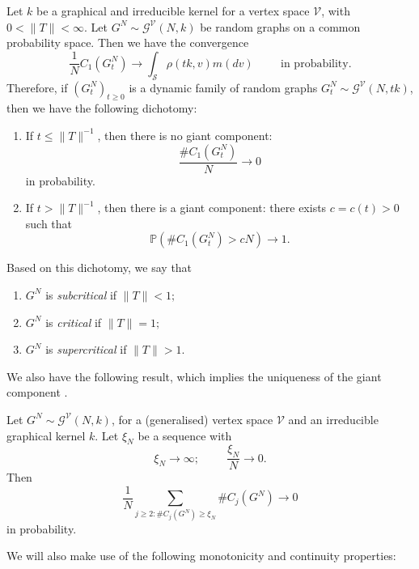    \begin{theorem}\label{thrm: RG1} Let $k$ be a graphical and irreducible kernel for a vertex space $\mathcal{V}$, with $0<\|T\|< \infty.$ Let $G^N\sim \mathcal{G}^\mathcal{V}(N, k)$ be random graphs on a common probability space. Then we have the convergence \begin{equation}
       \frac{1}{N}C_1(G^N_t)\rightarrow \int_{\mathcal{S}} \rho(tk, v) m(dv) \hspace{1cm} \text{in probability.}
   \end{equation}
   Therefore, if $(G^N_t)_{t\geq 0}$ is a dynamic family of random graphs $
       G^N_t \sim \mathcal{G}^\mathcal{V}(N, tk)$, then we have the following dichotomy:  \begin{enumerate}[label=\roman{*}).]
       \item If $t\leq \|T\|^{-1}$, then there is no giant component: \begin{equation}
           \frac{\#C_1(G^N_t)}{N} \rightarrow 0
       \end{equation} in probability.
       \item If $t>\|T\|^{-1}$, then there is a giant component: there exists $c=c(t)>0$ such that
       \begin{equation}
           \mathbb{P}(\#C_1(G^N_t)>cN)\rightarrow 1.
       \end{equation}
   \end{enumerate}\end{theorem}
   \begin{remark} Based on this dichotomy, we say that \begin{enumerate}[label=\roman{*}).]
       \item $G^N$ is \emph{subcritical} if $\|T\|<1;$
       \item $G^N$ is \emph{critical} if $\|T\|=1;$
       \item $G^N$ is \emph{supercritical} if $\|T\|>1.$
   \end{enumerate} \end{remark} We also have the following result, which implies the uniqueness of the giant component \cite[Theorem 3.6]{BJR07}.
   \begin{theorem}\label{thrm: RG2} Let $G^N\sim \mathcal{G}^\mathcal{V}(N, k)$, for a (generalised) vertex space $\mathcal{V}$ and an irreducible graphical kernel $k$. Let $\xi_N$ be a sequence with  \begin{equation}
       \xi_N\rightarrow \infty; \hspace{1cm} \frac{\xi_N}{N}\rightarrow 0.
   \end{equation} Then \begin{equation}
       \frac{1}{N}\sum_{j\geq 2: \#C_j(G^N)\geq \xi_N}\#C_j(G^N) \rightarrow 0
   \end{equation} in probability. \end{theorem}   We will also make use of the following monotonicity and continuity properties: \cite[Theorem 6.4]{BJR07}
